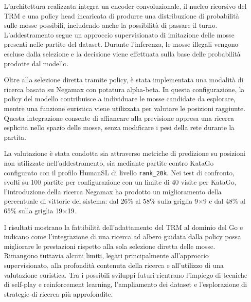\documentclass[a4paper,11pt]{article}
\begin{document}
L'architettura realizzata integra un encoder convoluzionale, il nucleo ricorsivo del TRM e una policy head incaricata di produrre una distribuzione di probabilità sulle mosse possibili, includendo anche la possibilità di passare il turno. L'addestramento segue un approccio supervisionato di imitazione delle mosse presenti nelle partite del dataset. Durante l'inferenza, le mosse illegali vengono escluse dalla selezione e la decisione viene effettuata sulla base delle probabilità prodotte dal modello.

Oltre alla selezione diretta tramite policy, è stata implementata una modalità di ricerca basata su Negamax con potatura alpha-beta. In questa configurazione, la policy del modello contribuisce a individuare le mosse candidate da esplorare, mentre una funzione euristica viene utilizzata per valutare le posizioni raggiunte. Questa integrazione consente di affiancare alla previsione appresa una ricerca esplicita nello spazio delle mosse, senza modificare i pesi della rete durante la partita.

La valutazione è stata condotta sia attraverso metriche di predizione su posizioni non utilizzate nell'addestramento, sia mediante partite contro KataGo configurato con il profilo HumanSL di livello \texttt{rank\_20k}. Nei test di confronto, svolti su 100 partite per configurazione con un limite di 40 visite per KataGo, l'introduzione della ricerca Negamax ha prodotto un miglioramento della percentuale di vittorie del sistema: dal 26\% al 58\% sulla griglia 9$\times$9 e dal 48\% al 65\% sulla griglia 19$\times$19.

I risultati mostrano la fattibilità dell'adattamento del TRM al dominio del Go e indicano come l'integrazione di una ricerca ad albero guidata dalla policy possa migliorare le prestazioni rispetto alla sola selezione diretta delle mosse.
Rimangono tuttavia alcuni limiti, legati principalmente all'approccio supervisionato, alla profondità contenuta della ricerca e all'utilizzo di una valutazione euristica.
Tra i possibili sviluppi futuri rientrano l'impiego di tecniche di self-play e reinforcement learning, l'ampliamento dei dataset e l'esplorazione di strategie di ricerca più approfondite.
\end{document}
